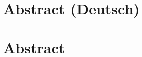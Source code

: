 \documentclass[
12pt, %
oneside, %
chapterinoneline,%
ngerman, %
onehalfspacing, %
draft=false, %
nolistspacing, %
headsepline %
]{MastersDoctoralThesis} %
\author{John Doe} %
\begin{document}
\frontmatter %

\pagestyle{plain} %




\chapter*{Abstract (Deutsch)}


\chapter*{Abstract}





\cleardoublepage


%
%

\end{document}
